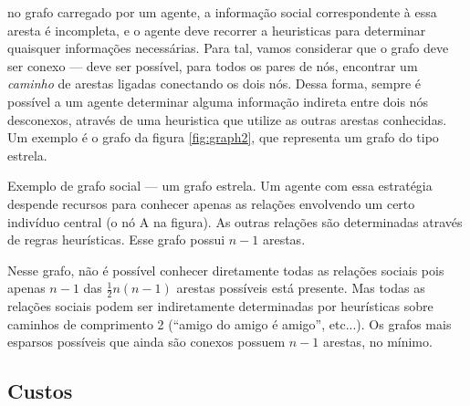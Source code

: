   no grafo carregado por um agente, a informação social correspondente à essa aresta é incompleta, e o agente deve recorrer a heuristicas para determinar quaisquer informações necessárias. Para tal, vamos considerar que o grafo deve ser conexo --- deve ser possível, para todos os pares de nós, encontrar um \emph{caminho} de arestas ligadas conectando os dois nós. Dessa forma, sempre é possível a um agente determinar alguma informação indireta entre dois nós desconexos, através de uma heuristica que utilize as outras arestas conhecidas. Um exemplo é o grafo da figura \ref{fig:graph2}, que representa um grafo do tipo estrela. 
 \begin{marginfigure}
\caption[Grafo estrela]{Exemplo de grafo social --- um grafo estrela. Um agente com essa estratégia despende recursos para conhecer apenas as relações envolvendo um certo indivíduo central (o nó A na figura). As outras relações são determinadas através de regras heurísticas. Esse grafo possui $n-1$ arestas.}
\label{fig:graph2}
\end{marginfigure}
Nesse grafo, não é possível conhecer diretamente todas as relações sociais pois apenas $n-1$ das $\frac{1}{2}n(n-1)$ arestas possíveis está presente. Mas todas as relações sociais podem ser indiretamente determinadas por heurísticas sobre caminhos de comprimento 2 (``amigo do amigo é amigo'', etc...). Os grafos mais esparsos possíveis que ainda são conexos possuem $n-1$ arestas, no mínimo.

\subsection{Custos}

